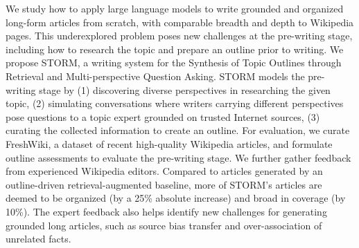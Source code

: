 We study how to apply large language models to write grounded and organized long-form articles from scratch, with comparable breadth and depth to Wikipedia pages. This underexplored problem poses new challenges at the pre-writing stage, including how to research the topic and prepare an outline prior to writing. We propose STORM, a writing system for the Synthesis of Topic Outlines through Retrieval and Multi-perspective Question Asking. STORM models the pre-writing stage by (1) discovering diverse perspectives in researching the given topic, (2) simulating conversations where writers carrying different perspectives pose questions to a topic expert grounded on trusted Internet sources, (3) curating the collected information to create an outline. For evaluation, we curate FreshWiki, a dataset of recent high-quality Wikipedia articles, and formulate outline assessments to evaluate the pre-writing stage. We further gather feedback from experienced Wikipedia editors. Compared to articles generated by an outline-driven retrieval-augmented baseline, more of STORM’s articles are deemed to be organized (by a 25\% absolute increase) and broad in coverage (by 10\%). The expert feedback also helps identify new challenges for generating grounded long articles, such as source bias transfer and over-association of unrelated facts.